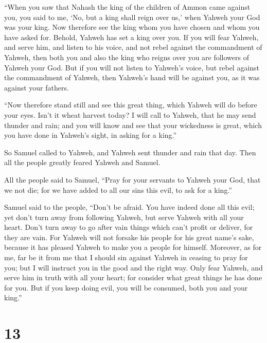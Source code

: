  ``When you saw that Nahash the king of the children of
Ammon came against you, you said to me, `No, but a king shall reign over
us,' when Yahweh your God was your king.  Now therefore
see the king whom you have chosen and whom you have asked for. Behold,
Yahweh has set a king over you.  If you will fear Yahweh,
and serve him, and listen to his voice, and not rebel against the
commandment of Yahweh, then both you and also the king who reigns over
you are followers of Yahweh your God.  But if you will
not listen to Yahweh's voice, but rebel against the commandment of
Yahweh, then Yahweh's hand will be against you, as it was against your
fathers.

 ``Now therefore stand still and see this great thing,
which Yahweh will do before your eyes.  Isn't it wheat
harvest today? I will call to Yahweh, that he may send thunder and rain;
and you will know and see that your wickedness is great, which you have
done in Yahweh's sight, in asking for a king.''

 So Samuel called to Yahweh, and Yahweh sent thunder and
rain that day. Then all the people greatly feared Yahweh and Samuel.

 All the people said to Samuel, ``Pray for your servants
to Yahweh your God, that we not die; for we have added to all our sins
this evil, to ask for a king.''

 Samuel said to the people, ``Don't be afraid. You have
indeed done all this evil; yet don't turn away from following Yahweh,
but serve Yahweh with all your heart.  Don't turn away to
go after vain things which can't profit or deliver, for they are vain.
 For Yahweh will not forsake his people for his great
name's sake, because it has pleased Yahweh to make you a people for
himself.  Moreover, as for me, far be it from me that I
should sin against Yahweh in ceasing to pray for you; but I will
instruct you in the good and the right way.  Only fear
Yahweh, and serve him in truth with all your heart; for consider what
great things he has done for you.  But if you keep doing
evil, you will be consumed, both you and your king.''

\hypertarget{section-12}{%
\section{13}\label{section-12}}

